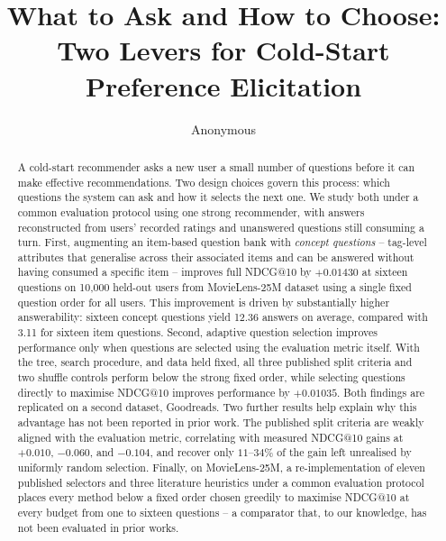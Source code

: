 \documentclass[runningheads]{llncs}
\begin{document}
\title{What to Ask and How to Choose: Two Levers for Cold-Start Preference Elicitation}

\author{Anonymous}

\maketitle

\begin{abstract}
A cold-start recommender asks a new user a small number of questions before it can make effective
recommendations. Two design choices govern this process: which questions the system can ask and how
it selects the next one. We study both under a common evaluation protocol using one strong
recommender, with answers reconstructed from users' recorded ratings and unanswered questions still
consuming a turn. First, augmenting an item-based question bank with \emph{concept questions} --
tag-level attributes that generalise across their associated items and can be answered without
having consumed a specific item -- improves full NDCG@10 by $+0.01430$ at sixteen questions on
10{,}000 held-out users from MovieLens-25M dataset using a single fixed question order for all
users. This improvement is driven by substantially higher answerability: sixteen concept
questions yield 12.36 answers on average, compared with 3.11 for sixteen item questions. Second,
adaptive question selection improves performance only when questions are selected using the
evaluation metric itself. With the tree, search procedure, and data held fixed, all three published
split criteria and two shuffle controls perform below the strong fixed order, while selecting
questions directly to maximise NDCG@10 improves performance by $+0.01035$. Both findings are
replicated on a second dataset, Goodreads. Two further results help explain why this advantage has not been
reported in prior work. The published split criteria are weakly aligned with the evaluation metric,
correlating with measured NDCG@10 gains at $+0.010$, $-0.060$, and $-0.104$, and recover only
$11$--$34\%$ of the gain left unrealised by uniformly random selection. Finally, on MovieLens-25M, a
re-implementation of eleven published selectors and three literature heuristics under a common
evaluation protocol places every method below a fixed order chosen greedily to maximise NDCG@10 at
every budget from one to sixteen questions -- a comparator that, to our knowledge, has not been
evaluated in prior works.
\end{abstract}
\end{document}
